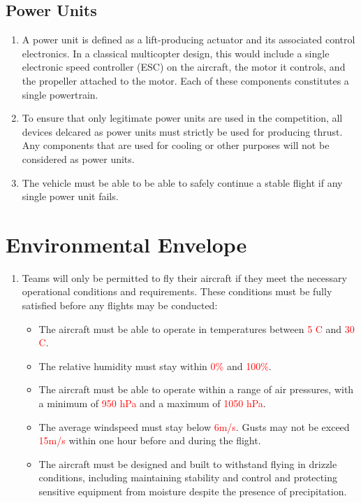 \documentclass{article}
\begin{document}
\subsection{Power Units}
\begin{enumerate}
  \item A power unit is defined as a lift-producing actuator and its associated control electronics. In a classical multicopter design, this would include a single electronic speed controller (ESC) on the aircraft, the motor it controls, and the propeller attached to the motor. Each of these components constitutes a single powertrain. 
  \item To ensure that only legitimate power units are used in the competition, all devices delcared as power units must strictly be used for producing thrust. Any components that are used for cooling or other purposes will not be considered as power units.
  \item The vehicle must be able to be able to safely continue a stable flight if any single power unit fails.  
\end{enumerate}



\section{Environmental Envelope}
\begin{enumerate}
  \item Teams will only be permitted to fly their aircraft if they meet the necessary operational conditions and requirements. These conditions must be fully satisfied before any flights may be conducted:
\begin {itemize}
  \item The aircraft must be able to operate in temperatures between \textcolor{red}{5 \degree C} and \textcolor{red}{30 \degree C}.
  \item The relative humidity must stay within \textcolor{red}{0\%} and \textcolor{red}{100\%}. 
  \item The aircraft must be able to operate within a range of air pressures, with a minimum of \textcolor{red}{950 hPa} and a maximum of \textcolor{red}{1050 hPa}.
  \item The average windspeed must stay below \textcolor{red}{6m/s}. Gusts may not be exceed \textcolor{red}{15m/s} within one hour before and during the flight.
  \item The aircraft must be designed and built to withstand flying in drizzle conditions, including maintaining stability and control and protecting sensitive equipment from moisture despite the presence of precipitation.
  
\end {itemize}
\end{enumerate}
\end{document}
